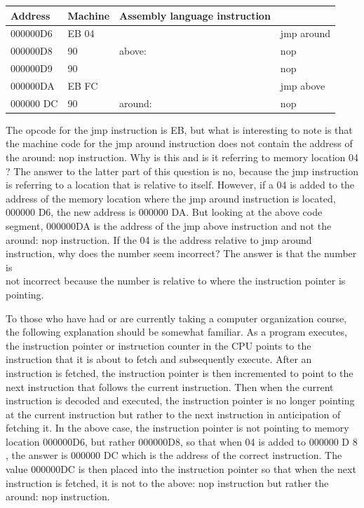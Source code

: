 \documentclass[10pt]{book}
\begin{document}
\begin{center}
\begin{tabular}{|l|l|l|l|}
\hline
Address & Machine & Assembly language instruction &  \\
\hline
000000D6 & EB 04 &  & jmp around \\
\hline
000000D8 & 90 & above: & nop \\
\hline
000000D9 & 90 &  & nop \\
\hline
000000DA & EB FC &  & jmp above \\
\hline
000000 DC & 90 & around: & nop \\
\hline
\end{tabular}
\end{center}

The opcode for the jmp instruction is EB, but what is interesting to note is that the machine code for the jmp around instruction does not contain the address of the around: nop instruction. Why is this and is it referring to memory location 04 ? The answer to the latter part of this question is no, because the jmp instruction is referring to a location that is relative to itself. However, if a 04 is added to the address of the memory location where the jmp around instruction is located, 000000 D6, the new address is 000000 DA. But looking at the above code segment, 000000DA is the address of the jmp above instruction and not the around: nop instruction. If the 04 is the address relative to jmp around instruction, why does the number seem incorrect? The answer is that the number is\\
not incorrect because the number is relative to where the instruction pointer is pointing.


To those who have had or are currently taking a computer organization course, the following explanation should be somewhat familiar. As a program executes, the instruction pointer or instruction counter in the CPU points to the instruction that it is about to fetch and subsequently execute. After an instruction is fetched, the instruction pointer is then incremented to point to the next instruction that follows the current instruction. Then when the current instruction is decoded and executed, the instruction pointer is no longer pointing at the current instruction but rather to the next instruction in anticipation of fetching it. In the above case, the instruction pointer is not pointing to memory location 000000D6, but rather 000000D8, so that when 04 is added to 000000 D 8 , the answer is 000000 DC which is the address of the correct instruction. The value 000000DC is then placed into the instruction pointer so that when the next instruction is fetched, it is not to the above: nop instruction but rather the around: nop instruction.
\end{document}
